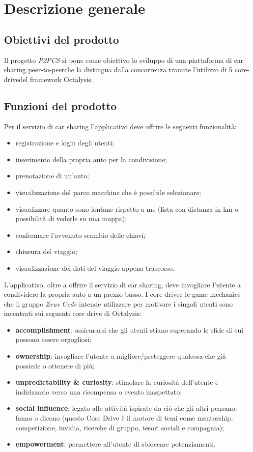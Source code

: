 \section{Descrizione generale} 
\subsection{Obiettivi del prodotto}

Il progetto \textit{P2PCS} si pone come obiettivo lo sviluppo di una piattaforma di car sharing peer-to-peer\glosp che la distingua dalla concorrenza tramite l'utilizzo di 5 core-drive\glosp del framework Octalysis\glosp .

\subsection{Funzioni del prodotto}
Per il servizio di car sharing l'applicativo deve offrire le seguenti funzionalità:
\begin{itemize}
	\item registrazione e login degli utenti;
	\item inserimento della propria auto per la condivisione;
	\item prenotazione di un'auto;
	\item visualizzazione del parco macchine che è possibile selezionare;
	\item visualizzare quanto sono lontane rispetto a me (lista con distanza in km o possibilità di vederle su una mappa);
	\item confermare l’avvenuto scambio delle chiavi;
	\item chiusura del viaggio;
	\item visualizzazione dei dati del viaggio appena trascorso.
\end{itemize}
L'applicativo, oltre a offrire il servizio di car sharing, deve invogliare l'utente a condividere la propria auto a un prezzo basso. 
I core drive\glosp e le game mechanics che il gruppo \textit{Zeus Code} intende utilizzare per motivare i singoli utenti sono incentrati sui seguenti core drive di Octalysis\glo : 
\begin{itemize}
	\item \textbf{accomplishment}: assicurarsi che gli utenti stiano superando le sfide di cui possono essere orgogliosi;
	\item \textbf{ownership}: invogliare l'utente a migliore/preteggere qualcosa che già possiede o ottenere di più;
	\item \textbf{unpredictability \& curiosity}: stimolare la curiosità dell'utente e indirizzarlo verso una ricompensa o evento inaspettato;
	\item \textbf{social influence}: legato alle attività ispirate da ciò che gli altri pensano, fanno o dicono (questo Core Drive è il motore di temi come mentorship, competizione, invidia, ricerche di gruppo, tesori sociali e compagnia);
	\item \textbf{empowerment}: permettere all'utente di sbloccare potenziamenti.
\end{itemize}
